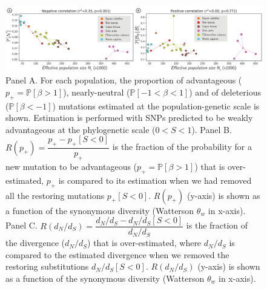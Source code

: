 \documentclass{article}
\newcommand{\proba}{\mathbb{P}}
\newcommand{\dn}{d_N}
\newcommand{\ds}{d_S}
\newcommand{\dnds}{\dn / \ds}
\newcommand{\Sphy}{S}
\newcommand{\divWeakAdv}{0 < \Sphy < 1}
\newcommand{\Spop}{\beta}
\newcommand{\polyDel}{\Spop < -1}
\newcommand{\polyNeutral}{-1 < \Spop < 1}
\newcommand{\polyAdv}{ \Spop > 1}
\newcommand{\PpolyDel}{\proba \left[ \polyDel \right]}
\newcommand{\PpolyNeutral}{\proba \left[ \polyNeutral \right]}
\newcommand{\PpolyAdv}{\proba \left[ \polyAdv \right]}
\begin{document}
    \begin{figure}[!ht]
        \centering
        \includegraphics[width=\textwidth, page=1] {artworks/figure.diversity}
        \caption{
            Panel A. For each population, the proportion of advantageous ($p_+=\PpolyAdv$), nearly-neutral ($\PpolyNeutral$) and of deleterious ($\PpolyDel$) mutations estimated at the population-genetic scale is shown.
            Estimation is performed with SNPs predicted to be weakly advantageous at the phylogenetic scale ($\divWeakAdv$).
            Panel B. $R(p_+)=\dfrac{p_+ - p_+[\Sphy < 0]}{p_+}$ is the fraction of the probability for a new mutation to be advantageous ($p_+=\PpolyAdv$) that is over-estimated, $p_+$ is compared to its estimation when we had removed all the restoring mutations $p_+[\Sphy < 0]$.
            $R(p_+)$ (y-axis) is shown as a function of the synonymous diversity (Watterson $\theta_w$ in x-axis).
            Panel C. $R(\dnds)=\dfrac{\dnds - \dnds[\Sphy < 0]}{\dnds}$ is the fraction of the divergence ($\dnds$) that is over-estimated, where $\dnds$ is compared to the estimated divergence when we removed the restoring substitutions $\dnds[\Sphy < 0]$.
            $R(\dnds)$ (y-axis) is shown as a function of the synonymous diversity (Watterson $\theta_w$ in x-axis).
        }
        \label{fig:diversity}
    \end{figure}
\end{document}
